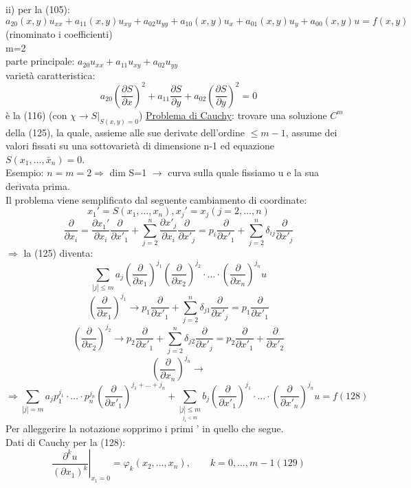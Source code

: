 \documentclass[a4paper,11pt]{report}
\newcommand{\x}{\bar{x}}
\begin{document}
ii) per la (105):
$$
a_{20}(x,y)u_{xx}+a_{11}(x,y)u_{xy} + a_{02}u_{yy} + a_{10}(x,y)u_x + a_{01}(x,y)u_y + a_{00}(x,y)u = f(x,y)
$$
(rinominato i coefficienti)\\
m=2\\
parte principale: $a_{20}u_{xx} + a_{11}u_{xy} + a_{02}u_{yy} $\\
varietà caratteristica:
$$
a_{20}\left(\dfrac{\partial S}{\partial x}\right)^2 + a_{11}\dfrac{\partial S}{\partial y} + a_{02}\left(\dfrac{\partial S}{\partial y}\right)^2=0
$$
è la (116) (con $\chi \rightarrow S|_{S(x,y)=0}$)
\underline{Problema di Cauchy}: trovare una soluzione $C^m$ della (125), la quale, assieme alle sue derivate dell'ordine $\leq m-1$, assume dei valori fissati su una sottovarietà di dimensione n-1 ed equazione $S(x_1,\dots,\x_n)=0$.\\
Esempio: $n=m=2 \Rightarrow $ dim S=1 $\rightarrow$ curva sulla quale fissiamo u e la sua derivata prima.\\
Il problema viene semplificato dal seguente cambiamento di coordinate:
$$
x_1'=S(x_1,\dots,x_n), x_j'=x_j (j=2,\dots,n)
$$
$$
\dfrac{\partial}{\partial x_i} = \dfrac{\partial x_1'}{\partial x_i}\dfrac{\partial}{\partial x'_1}+\sum_{j=2}^n \dfrac{\partial x'_j}{\partial x_i}\dfrac{\partial}{\partial x'_j}=p_i\dfrac{\partial}{\partial x'_1} + \sum_{j=2}^n \delta_{ij} \dfrac{\partial}{\partial x'_j}
$$
$\Rightarrow$ la (125) diventa:
$$
\sum_{|j| \leq m} a_j\left(\dfrac{\partial}{\partial x_1}\right)^{j_1}\left(\dfrac{\partial}{\partial x_2}\right)^{j_2}\cdot \dots\cdot \left(\dfrac{\partial}{\partial x_n}\right)^{j_n}u
$$
$$
\left(\dfrac{\partial}{\partial x_1}\right)^{j_1} \rightarrow p_1\dfrac{\partial}{\partial x'_1} + \sum_{j=2}^n \delta_{j1}\dfrac{\partial}{\partial x'_j} = p_1\dfrac{\partial}{\partial x'_1}
$$
$$
\left(\dfrac{\partial}{\partial x_2}\right)^{j_2} \rightarrow p_2\dfrac{\partial}{\partial x'_1} + \sum_{j=2}^n \delta_{j2}\dfrac{\partial}{\partial x'_j} = p_2\dfrac{\partial}{\partial x'_1} + \dfrac{\partial}{\partial x'_2}
$$
$$
\left(\dfrac{\partial}{\partial x_n}\right)^{j_n} \rightarrow
$$
\begin{equation}
\Rightarrow \sum_{|j|=m} a_j p_1^{j_1}\cdot \dots \cdot p_n^{j_n}\left(\dfrac{\partial}{\partial x'_1}\right)^{j_1 + \dots  + j_n} + \sum_{\underset{j_1<m}{|j|\leq m}}b_j\left(\dfrac{\partial}{\partial x'_1}\right)^{j_1} \cdot \dots \cdot \left(\dfrac{\partial}{\partial x'_n}\right)^{j_n}u=f (128)
\end{equation}
Per alleggerire la notazione sopprimo i primi ' in quello che segue.\\
Dati di Cauchy per la (128):
\begin{equation}
\left.\dfrac{\partial^k u}{(\partial x_1)^k}\right|_{x_1=0}=\varphi_k(x_2,\dots, x_n) , \qquad k=0,\dots,m-1 (129)
\end{equation}
\end{document}
